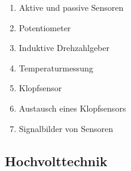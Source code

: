 \begin{enumerate}
\item
  Aktive und passive Sensoren\\
\item
  Potentiometer\\
\item
  Induktive Drehzahlgeber\\
\item
  Temperaturmessung\\
\item
  Klopfsensor\\
\item
  Austausch eines Klopfsensors\\
\item
  Signalbilder von Sensoren
\end{enumerate}

\subsection{Hochvolttechnik}\label{hochvolttechnik}

